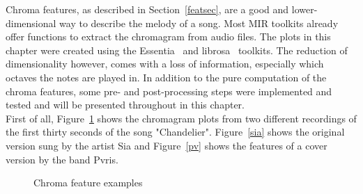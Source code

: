 Chroma features, as described in Section~\ref{featsec}, are a good and lower-dimensional way to describe the melody of a song. Most MIR toolkits already offer functions to extract the chromagram from audio files. The plots in this chapter were created using the Essentia~\cite{essentia1} and librosa~\cite{librosa1} toolkits. 
The reduction of dimensionality however, comes with a loss of information, especially which octaves the notes are played in. In addition to the pure computation of the chroma features, some pre- and post-processing steps were implemented and tested and will be presented throughout in this chapter.\\
First of all, Figure~\ref{fig:chroma1} shows the chromagram plots from two different recordings of the first thirty seconds of the song "Chandelier". Figure~\ref{sia} shows the original version sung by the artist Sia and Figure~\ref{pv} shows the features of a cover version by the band Pvris. 
\begin{figure}[htbp]
	\centering
	\caption{Chroma feature examples}
	\label{fig:chroma1}
\end{figure}
